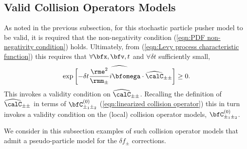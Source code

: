 \subsection*{Valid Collision Operators Models}
    As noted in the previous subsection, for this stochastic particle pusher model to be valid, it is required that the non-negativity condition (\ref{eqn:PDF non-negativity condition}) holds. Ultimately, from (\ref{eqn:Levy process characteristic function}) this requires that $\forall \bfx, \bfv, t$ and $\forall \delta t$ sufficiently small,
    \begin{equation}\label{eqn:linearized collision operator non-negativity}
        \widehat{\exp\left[- \delta t\frac{\rme^{2}}{\rmm_{\pm}}i\bfomega\cdot\widehat{\calC}_{\pm\pm}\right]}  \geq  0.
    \end{equation}
    This invokes a validity condition on $\widehat{\calC}_{\pm\pm}$. Recalling the definition of $\widehat{\calC}_{\pm\pm}$ in terms of $\bfC_{\pm_{1}\pm_{2}}^{(0)}$ (\ref{eqn:linearized collision operator}) this in turn invokes a validity condition on the (local) collision operator models, $\bfC_{\pm_{1}\pm_{2}}^{(0)}$.
    
    We consider in this subsection examples of such collision operator models that admit a pseudo-particle model for the $\delta\!f_{\pm}$ corrections.
    
    \shortline

